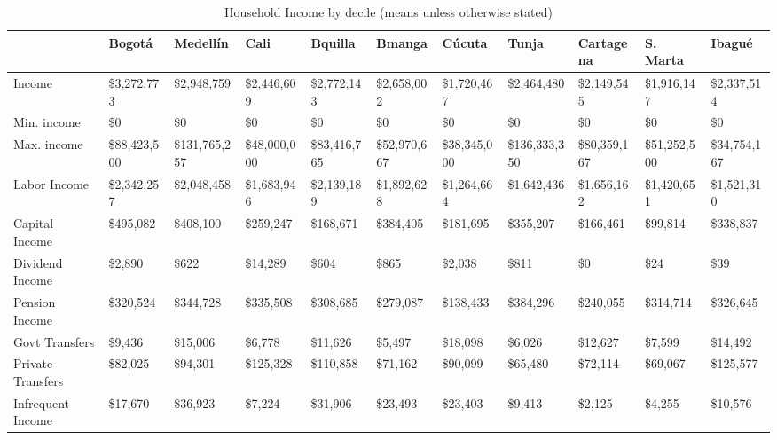 \documentclass[12pt]{article}
\begin{document}
\begin{landscape}
\break

\begin{table}[]
\caption{Household Income by decile (means unless otherwise stated)}
\label{tab:ycity}
\footnotesize
\begin{tabular}{lllllllllll}\\ \hline
& Bogot\'{a}                           & Medell\'{i}n     & Cali          & Bquilla & Bmanga  & C\'{u}cuta       & Tunja        & Cartagena     & S. Marta  & Ibagu\'{e}                     \\ \hline
Income                           & \$3,272,773  & \$2,948,759   & \$2,446,609  & \$2,772,143  & \$2,658,002  & \$1,720,467  & \$2,464,480   & \$2,149,545  & \$1,916,147  & \$2,337,514  \\
Min. income                   & \$0          & \$0           & \$0          & \$0          & \$0          & \$0          & \$0           & \$0          & \$0          & \$0          \\
Max. income                   & \$88,423,500 & \$131,765,257 & \$48,000,000 & \$83,416,765 & \$52,970,667 & \$38,345,000 & \$136,333,350 & \$80,359,167 & \$51,252,500 & \$34,754,167 \\
Labor Income                     & \$2,342,257  & \$2,048,458   & \$1,683,946  & \$2,139,189  & \$1,892,628  & \$1,264,664  & \$1,642,436   & \$1,656,162  & \$1,420,651  & \$1,521,310  \\
Capital Income                   & \$495,082    & \$408,100     & \$259,247    & \$168,671    & \$384,405    & \$181,695    & \$355,207     & \$166,461    & \$99,814     & \$338,837    \\
Dividend Income                  & \$2,890      & \$622         & \$14,289     & \$604        & \$865        & \$2,038      & \$811         & \$0          & \$24         & \$39         \\
Pension Income                   & \$320,524    & \$344,728     & \$335,508    & \$308,685    & \$279,087    & \$138,433    & \$384,296     & \$240,055    & \$314,714    & \$326,645    \\
Govt Transfers & \$9,436      & \$15,006      & \$6,778      & \$11,626     & \$5,497      & \$18,098     & \$6,026       & \$12,627     & \$7,599      & \$14,492     \\
Private Transfers    & \$82,025     & \$94,301      & \$125,328    & \$110,858    & \$71,162     & \$90,099     & \$65,480      & \$72,114     & \$69,067     & \$125,577    \\
Infrequent Income                & \$17,670     & \$36,923      & \$7,224      & \$31,906     & \$23,493     & \$23,403     & \$9,413       & \$2,125      & \$4,255      & \$10,576     \\

\end{tabular}
\end{table}
\end{landscape}
\end{document}
